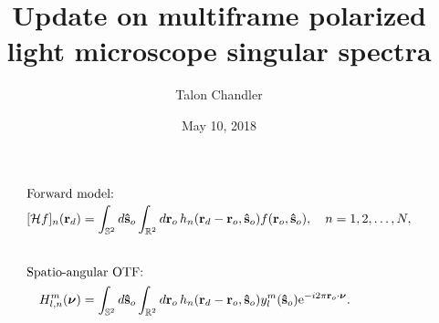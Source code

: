 \documentclass[presentation]{beamer}
\author{Talon Chandler}
\date{May 10, 2018}
\title{Update on multiframe polarized light microscope singular spectra}
\newcommand{\me}{\mathrm{e}}
\providecommand{\ro}[1]{\mathbf{\mathbf{r}}_o}
\providecommand{\so}[1]{\mathbf{\hat{s}}_o}
\providecommand{\rd}[1]{\mathbf{r}_d}
\providecommand{\mbb}[1]{\mathbb{#1}}
\providecommand{\bs}[1]{\boldsymbol{#1}}
\begin{document}
\maketitle

\begin{frame}
  \vspace{-2em}
  \begin{align*}
    \intertext{Forward model:}
    [\mathcal{H}f]_n(\rd{}) &= \int_{\mbb{S}^2}d\so{}\int_{\mbb{R}^2}d\ro{}\, h_n(\rd{}- \ro{}, \so{})f(\ro{}, \so{}),\quad  n=1, 2,\ldots,N,\\[2em]
    \intertext{Spatio-angular OTF:}
    H_{l,n}^{m}(\bs{\nu}) &= \int_{\mbb{S}^2}d\so{}\int_{\mbb{R}^2}d\ro{}\, h_n(\rd{}- \ro{}, \so{})y_l^m(\so{})\me^{-i 2\pi\ro{}\cdot\bs{\nu}}.
  \end{align*}
\end{frame}
\end{document}

